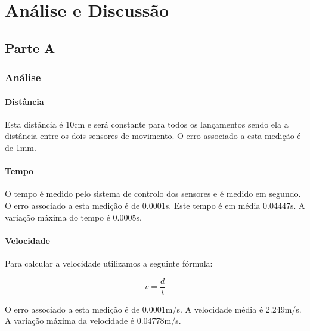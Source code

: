 
\chapter{Análise e Discussão}
\label{ch:analise-discussao}
{

\section{Parte A}
\label{sec:analise-discussao-parte1}

\subsection{Análise}
\label{subsec:analise-discussao-parte1-analise}

\subsubsection{Distância}
\label{subsec:analise-discussao-parte1-distancia}

Esta distância é 10cm e será constante para todos os lançamentos sendo ela a distância entre os dois sensores de movimento. O erro associado a esta medição é de 1mm.

\subsubsection{Tempo}
\label{subsec:analise-discussao-parte1-tempo}

O tempo é medido pelo sistema de controlo dos sensores e é medido em segundo. O erro associado a esta medição é de 0.0001s. Este tempo é em média 0.04447s. A variação máxima do tempo é 0.0005s.

\subsubsection{Velocidade}
\label{subsec:analise-discussao-parte1-velocidade}

Para calcular a velocidade utilizamos a seguinte fórmula:

\begin{equation}
    v = \frac{d}{t}
\end{equation}

O erro associado a esta medição é de 0.0001m/s. A velocidade média é 2.249m/s. A variação máxima da velocidade é 0.04778m/s.

}
